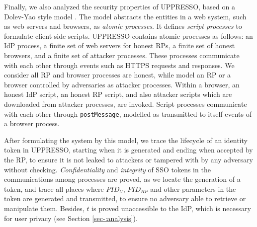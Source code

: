 \vspace{0.5mm}
Finally, we also analyzed the security properties of UPPRESSO, %
     based on a Dolev-Yao style model \cite{SPRESSO}.
The model abstracts the entities in a web system,
    such as web servers and browsers,
    as \emph{atomic processes}. %
It defines \emph{script processes} to formulate client-side scripts.
%
%
%
%
UPPRESSO contains atomic processes as follows:
an IdP process,
    a finite set of web servers for honest RPs, a finite set of honest browsers, and a finite set of attacker processes.
These processes communicate with each other through events such as HTTPS requests and responses.
We consider all RP and browser processes are honest,
 while model an RP or a browser controlled by adversaries as attacker processes.
Within a browser,
 an honest IdP script, an honest RP script, and also attacker scripts which are downloaded from attacker processes,
  are invoked.
Script processes communicate with each other through \verb+postMessage+,
    modelled as transmitted-to-itself events of a browser process.



After formulating the system by this model,
    we trace the lifecycle of an identity token in UPPRESSO,
        starting when it is generated and ending when accepted by the RP,
 to ensure it is not leaked to attackers or tampered with by any adversary without checking.
\emph{Confidentiality} and \emph{integrity} of SSO tokens  in the communications among processes are proved,
as we locate the generation of a token, and trace all places
    where $PID_U$, $PID_{RP}$ and other parameters in the token are generated and transmitted,
     to ensure no adversary able to retrieve or manipulate them.
Besides, $t$ is proved unaccessible to the IdP, which is necessary for user privacy (see Section \ref{sec-:analysis}).


